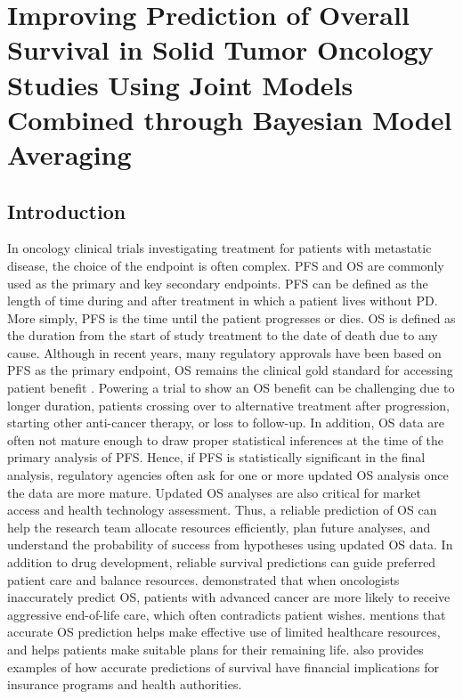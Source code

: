 \chapter{Improving Prediction of Overall Survival in Solid Tumor Oncology Studies Using Joint Models Combined through Bayesian Model Averaging}
\label{chpt:chpt3}

\section{Introduction}
In oncology clinical trials investigating treatment for patients with metastatic disease, the choice of the endpoint is often complex. \ac{PFS} and \ac{OS} are commonly used as the primary and key secondary endpoints. \ac{PFS} can be defined as the length of time during and after treatment in which a patient lives without PD. More simply, \ac{PFS} is the time until the patient progresses or dies. \ac{OS} is defined as the duration from the start of study treatment to the date of death due to any cause. Although in recent years, many regulatory approvals have been based on \ac{PFS} as the primary endpoint, \ac{OS} remains the clinical gold standard for accessing patient benefit \citep{tang2007surrogate, driscoll2009overall, methy2010surrogate, grigore2020surrogate}. Powering a trial to show an \ac{OS} benefit can be challenging due to longer duration, patients crossing over to alternative treatment after progression, starting other anti-cancer therapy, or loss to follow-up. In addition, \ac{OS} data are often not mature enough to draw proper statistical inferences at the time of the primary analysis of \ac{PFS}. Hence, if \ac{PFS} is statistically significant in the final analysis, regulatory agencies often ask for one or more updated \ac{OS} analysis once the data are more mature. Updated \ac{OS} analyses are also critical for market access and health technology assessment. Thus, a reliable prediction of \ac{OS} can help the research team allocate resources efficiently, plan future analyses, and understand the probability of success from hypotheses using updated \ac{OS} data. In addition to drug development, reliable survival predictions can guide preferred patient care and balance resources. \cite{sborov2019impact} demonstrated that when oncologists inaccurately predict \ac{OS}, patients with advanced cancer are more likely to receive aggressive end-of-life care, which often contradicts patient wishes. \cite{mackillop1997measuring} mentions that accurate \ac{OS} prediction helps make effective use of limited healthcare resources, and helps patients make suitable plans for their remaining life. \cite{henderson2001accuracy} also provides examples of how accurate predictions of survival have financial implications for insurance programs and health authorities.

